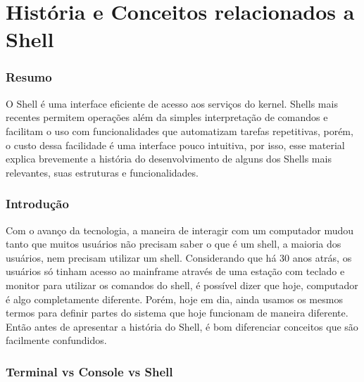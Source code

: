\documentclass[oneside, 11 pt]{article}
\begin{document}
	\newpage
	\part{História e Conceitos relacionados a Shell}
	
	\section{Resumo}
	O Shell é uma interface eficiente de acesso aos serviços do kernel. Shells mais recentes
	permitem operações além da simples interpretação de comandos e facilitam o uso com
	funcionalidades que automatizam tarefas repetitivas, porém, o custo dessa facilidade é uma
	interface pouco intuitiva, por isso, esse material explica brevemente a história do desenvolvimento de alguns dos Shells mais relevantes, suas estruturas e funcionalidades.
	
	\section{Introdução}
	Com o avanço da tecnologia, a maneira de interagir com um computador mudou tanto que muitos usuários não precisam saber o que é um shell, a maioria dos usuários, nem precisam utilizar um shell.
	Considerando que há 30 anos atrás, os usuários só tinham acesso ao mainframe através de uma estação com teclado e monitor para utilizar os comandos do shell, é possível dizer que hoje, computador é algo completamente diferente. Porém, hoje em dia, ainda usamos os mesmos termos para definir partes do sistema que hoje funcionam de maneira diferente. Então antes de apresentar a história do Shell, é bom diferenciar conceitos que são facilmente confundidos.
	
	\section{Terminal vs Console vs Shell}
	
\end{document}
